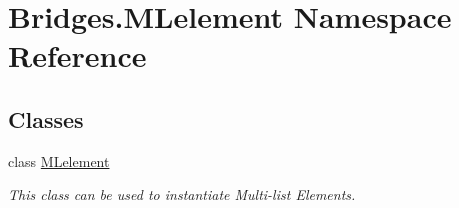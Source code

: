 \hypertarget{namespace_bridges_1_1_m_lelement}{}\section{Bridges.\+M\+Lelement Namespace Reference}
\label{namespace_bridges_1_1_m_lelement}
\subsection*{Classes}
\begin{DoxyCompactItemize}
\item 
class \mbox{\hyperlink{class_bridges_1_1_m_lelement_1_1_m_lelement}{M\+Lelement}}
\begin{DoxyCompactList}\small\item\em This class can be used to instantiate Multi-\/list Elements. \end{DoxyCompactList}\end{DoxyCompactItemize}
